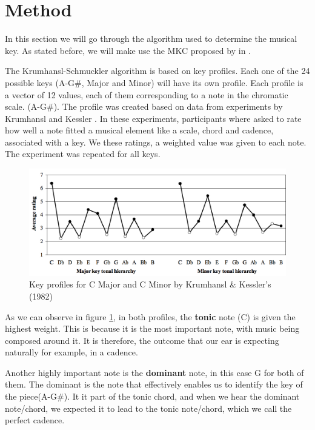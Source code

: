 \section{Method} \label{sec:method}
In this section we will go through the algorithm used to determine the musical key.
As stated before, we will make use the MKC proposed by \citeauthor{krumhansl2001cognitive} in \cite{krumhansl2001cognitive}.


The Krumhansl-Schmuckler algorithm is based on key profiles.
Each one of the 24 possible keys (A-G\#, Major and Minor) will have its own profile.
Each profile is a vector of 12 values, each of them corresponding to a note in the chromatic scale. (A-G\#).
The profile was created based on data from experiments by Krumhansl and Kessler \cite{krumhansl1982tracing}.
In these experiments, participants where asked to rate how well a note fitted a musical element like a scale, chord and cadence, associated with a key.
We these ratings, a weighted value was given to each note. The experiment was repeated for all keys.

\begin{figure}[H]
    \centering
    \includegraphics[width=.8\linewidth]{figs/method/key_profiles_C.png}
    \caption{Key profiles for C Major and C Minor by Krumhansl \& Kessler’s (1982)}
    \label{fig:key_profiles_c}
\end{figure}

As we can observe in figure \ref{fig:key_profiles_c}, in both profiles, the \textbf{tonic} note (C) is given the highest weight.
This is because it is the most important note, with music being composed around it. It is therefore, the outcome that our ear is expecting naturally for example, in a cadence.

Another highly important note is the \textbf{dominant} note, in this case G for both of them.
The dominant is the note that effectively enables us to identify the key of the piece(A-G\#).
It it part of the tonic chord, and when we hear the dominant note/chord, we expected it to lead to the tonic note/chord, which we call the perfect cadence.

